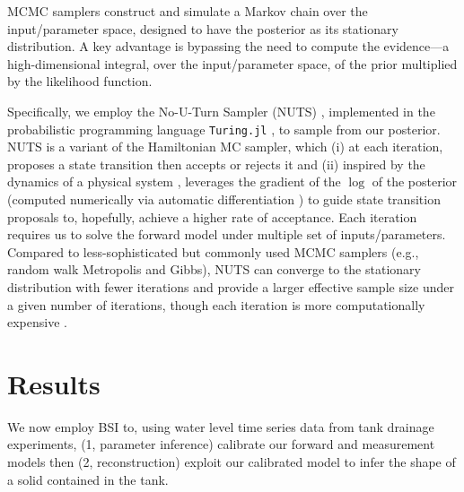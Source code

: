 \documentclass[a4paper,fleqn]{cas-dc}
\begin{document}
MCMC samplers construct and simulate a Markov chain \cite{dobrow2016introduction} over the input/parameter space, designed to have the posterior as its stationary distribution.
A key advantage is bypassing the need to compute the evidence---a high-dimensional integral, over the input/parameter space, of the prior multiplied by the likelihood function.

Specifically, we employ the No-U-Turn Sampler (NUTS) \cite{hoffman2014no}, implemented in the probabilistic programming language \cite{gordon2014probabilistic} \texttt{Turing.jl} \cite{ge2018turing,xu2020advancedhmc}, to sample from our posterior.
NUTS is a variant of the Hamiltonian MC \cite{betancourt2017conceptual} sampler, which (i) at each iteration, proposes a state transition then accepts or rejects it and (ii) inspired by the dynamics of a physical system \cite{duane1987hybrid}, leverages the gradient of the $\log$ of the posterior (computed numerically via automatic differentiation \cite{baydin2018automatic}) to guide state transition proposals to, hopefully, achieve a higher rate of acceptance.
Each iteration requires us to solve the forward model under multiple set of inputs/parameters. 
Compared to less-sophisticated but commonly used MCMC samplers (e.g., random walk Metropolis and Gibbs), NUTS can converge to the stationary distribution with fewer iterations and provide a larger effective sample size under a given number of iterations, though each iteration is more computationally expensive \cite{chong2017comparison,hoffman2014no,robert2018accelerating,shi2024bayesian,turner2017well}.


\section{Results}
We now employ BSI to, using water level time series data from tank drainage experiments,  
(1, parameter inference) calibrate our forward and measurement models then
(2, reconstruction) exploit our calibrated model to infer the shape of a solid contained in the tank.
\end{document}

